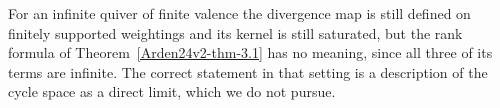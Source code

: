 \begin{remark}\label{Arden24v2-rem-4.2}
\label{Arden24v2-rem:infinite}
For an infinite quiver of finite valence the divergence map is still defined on finitely supported weightings and its kernel is still saturated, but the rank formula of Theorem~\ref{Arden24v2-thm-3.1} has no meaning, since all three of its terms are infinite. The correct statement in that setting is a description of the cycle space as a direct limit, which we do not pursue.
\end{remark}